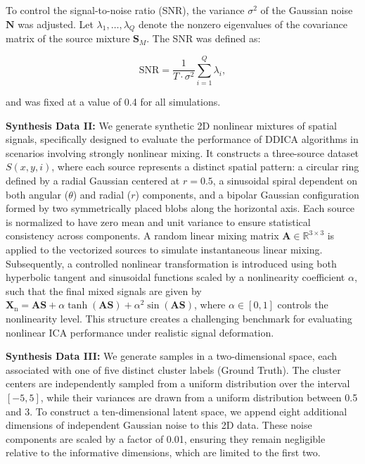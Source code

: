 \documentclass{article}
\begin{document}
To control the signal-to-noise ratio (SNR), the variance \(\sigma^2\) of the Gaussian noise \(\mathbf{N}\) was adjusted. Let \(\lambda_1, \dots, \lambda_Q\) denote the nonzero eigenvalues of the covariance matrix of the source mixture \(\mathbf{S}_M\). The SNR was defined as:

\[
\text{SNR} = \frac{1}{T \cdot \sigma^2} \sum_{i=1}^{Q} \lambda_i,
\]

\noindent and was fixed at a value of 0.4 for all simulations.

\textbf{Synthesis Data II:} We generate synthetic 2D nonlinear mixtures of spatial signals, specifically designed to evaluate the performance of DDICA algorithms in scenarios involving strongly nonlinear mixing. It constructs a three-source dataset \( S(x, y, i) \), where each source represents a distinct spatial pattern: a circular ring defined by a radial Gaussian centered at \( r = 0.5 \), a sinusoidal spiral dependent on both angular (\( \theta \)) and radial (\( r \)) components, and a bipolar Gaussian configuration formed by two symmetrically placed blobs along the horizontal axis. Each source is normalized to have zero mean and unit variance to ensure statistical consistency across components. A random linear mixing matrix \( \mathbf{A} \in \mathbb{R}^{3 \times 3} \) is applied to the vectorized sources to simulate instantaneous linear mixing. Subsequently, a controlled nonlinear transformation is introduced using both hyperbolic tangent and sinusoidal functions scaled by a nonlinearity coefficient \( \alpha \), such that the final mixed signals are given by \(\mathbf{X}_{\text{n}} = \mathbf{A} \mathbf{S} + \alpha \tanh(\mathbf{A} \mathbf{S}) + \alpha^2 \sin(\mathbf{A} \mathbf{S}) \), where \( \alpha \in [0,1] \) controls the nonlinearity level. This structure creates a challenging benchmark for evaluating nonlinear ICA performance under realistic signal deformation.

\textbf{Synthesis Data III:} We generate samples in a two-dimensional space, each associated with one of five distinct cluster labels (Ground Truth). The cluster centers are independently sampled from a uniform distribution over the interval $[-5, 5]$, while their variances are drawn from a uniform distribution between 0.5 and 3. To construct a ten-dimensional latent space, we append eight additional dimensions of independent Gaussian noise to this 2D data. These noise components are scaled by a factor of 0.01, ensuring they remain negligible relative to the informative dimensions, which are limited to the first two.
\end{document}
